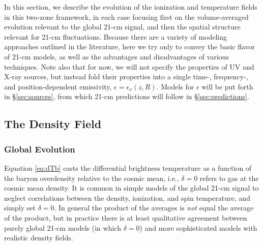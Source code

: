 In this section, we describe the evolution of the ionization and temperature fields in this two-zone framework, in each case focusing first on the volume-averaged evolution relevant to the global 21-cm signal, and then the spatial structure relevant for 21-cm fluctuations. Because there are a variety of modeling approaches outlined in the literature, here we try only to convey the basic flavor of 21-cm models, as well as the advantages and disadvantages of various techniques. Note also that for now, we will not specify the properties of UV and X-ray sources, but instead fold their properties into a single time-, frequency-, and position-dependent emissivity, $\epsilon = \epsilon_{\nu}(z,R)$. Models for $\epsilon$ will be put forth in \S\ref{sec:sources}, from which 21-cm predictions will follow in \S\ref{sec:predictions}. 



\subsection{The Density Field}
\subsubsection{Global Evolution} \label{sec:density_global}
Equation \ref{eq:dTb} casts the differential brightness temperature as a function of the baryon overdensity relative to the cosmic mean, i.e., $\delta = 0$ refers to gas at the cosmic mean density. It is common in simple models of the global 21-cm signal to neglect correlations between the density, ionization, and spin temperature, and simply set $\delta = 0$. In general the product of the averages is \textit{not} equal the average of the product, but in practice there is at least qualitative agreement between purely global 21-cm models (in which $\delta = 0$) and more sophisticated models with realistic density fields. 

